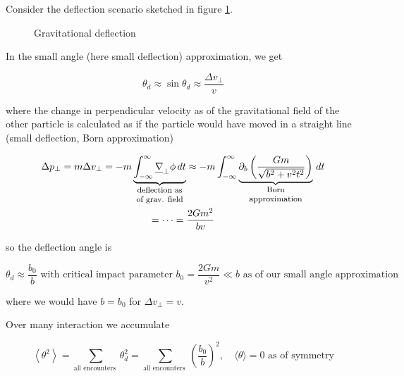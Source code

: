 Consider the deflection scenario sketched in figure \ref{fig:deflection}.

\begin{figure}[H]
    \centering
    
    \caption{Gravitational deflection}
    \label{fig:deflection}
\end{figure}

In the small angle (here small deflection) approximation, we get

\begin{equation}
    \theta_d \approx \sin \theta_d \approx \frac{\Delta v_\perp}{v}
\end{equation}

where the change in perpendicular velocity as of the gravitational field
of the other particle is calculated as if the particle would have moved
in a straight line (small deflection, Born approximation)

\begin{equation}
    \begin{gathered}
        \Delta p_\perp = m \Delta v_\perp = - m \explain{\int_{-\infty}^{\infty} \vec{\nabla}_\perp \phi \, dt}{deflection as of grav. field} \approx - m \int_{-\infty}^{\infty} \explain{\partial_b \left( \frac{Gm}{\sqrt{b^2+v^2 t^2}} \right)}{Born approximation} \, dt \\
        = \dots = \frac{2Gm^2}{bv}
    \end{gathered}
\end{equation}

so the deflection angle is

\begin{equation}
    \theta_d \approx \frac{b_0}{b} \text{ with critical impact parameter } b_0 = \frac{2Gm}{v^2} \ll b \text{ as of our small angle approximation}
\end{equation}

where we would have $b=b_0$ for $\Delta v_\perp = v$.

Over many interaction we accumulate

\begin{equation}
    \left\langle\theta^2\right\rangle=\sum_{\text {all encounters }} \theta_d^2=\sum_{\text {all encounters }}\left(\frac{b_0}{b}\right)^2, \quad \langle \theta \rangle = 0 \text{ as of symmetry}
\end{equation}

